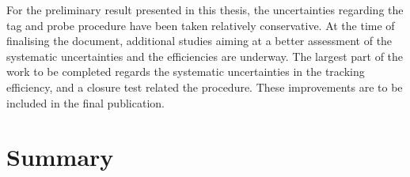 For the preliminary result presented in this thesis, the uncertainties
regarding the tag and probe procedure have been taken relatively
conservative. At the time of finalising the document, additional
studies aiming at a better assessment of the systematic uncertainties
and the efficiencies are
underway. The largest part of the work to be completed regards the
systematic uncertainties in the tracking efficiency, and a closure
test related the procedure. These improvements are to be included in
the final publication.
\vspace{0.3cm}



\section{Summary}
